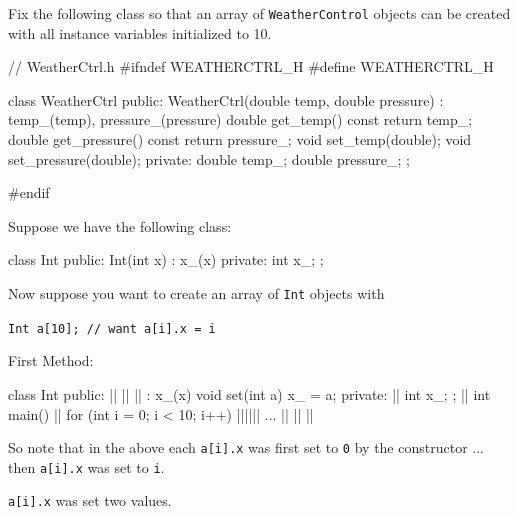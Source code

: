 \begin{ex}
Fix the following class so that an array of
\texttt{WeatherControl} objects can be created with all instance variables
initialized to 10.
\begin{console}
// WeatherCtrl.h
#ifndef WEATHERCTRL_H
#define WEATHERCTRL_H

class WeatherCtrl
{
public:
        WeatherCtrl(double temp, double pressure)
        : temp_(temp), pressure_(pressure)
        {}
        double get_temp() const { return temp_; }
        double get_pressure() const { return pressure_; }
        void set_temp(double);
        void set_pressure(double);
private:
        double temp_;
        double pressure_;
};

#endif
\end{console}
\end{ex}
Suppose we have the following class:

\begin{console}
class Int
{
public:
        Int(int x)
        : x_(x)
        {}
private:
        int x_;
};
\end{console}
Now suppose you want to create an array of \texttt{Int} objects with
\begin{center}
\texttt{Int a[10]; // want a[i].x = i}
\end{center}
First Method:
\begin{consolethree}[escapeinside=||]
class Int
{                      
public:
    || || ||  
        : x_(x) {}
    void set(int a)    
    {
        x_ = a;        
    }                  
private:                 ||  
    int x_;
};
||
int main()
{               
    ||
    for (int i = 0; i < 10; i++)
        ||||||
    ... || || ||
}
\end{consolethree}
\newpage So note that in the above each \texttt{a[i].x} was first set to \texttt{0} by the constructor ... then \texttt{a[i].x} was set to \texttt{i}.

 \texttt{a[i].x} was set two values.

